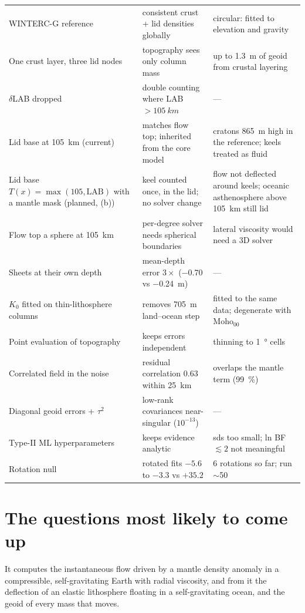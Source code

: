 \begin{center}
\begin{longtable}{p{}p{}p{}}
WINTERC-G reference & consistent crust + lid densities globally & circular: fitted to elevation and gravity\\
One crust layer, three lid nodes & topography sees only column mass & up to \qty{1.3}{m} of geoid from crustal layering\\
$\delta$LAB dropped & double counting where LAB $>\qty{105}{km}$ & ---\\
Lid base at \qty{105}{km} (current) & matches flow top; inherited from the core model & cratons \qty{+865}{m} high in the reference; keels treated as fluid\\
Lid base $T(x)=\max(105, \mathrm{LAB})$ with a mantle mask (planned, (b)) & keel counted once, in the lid; no solver change & flow not deflected around keels; oceanic asthenosphere above \qty{105}{km} still lid\\
Flow top a sphere at \qty{105}{km} & per-degree solver needs spherical boundaries & lateral viscosity would need a 3D solver\\
Sheets at their own depth & mean-depth error $3\times$ (\qty{-0.70}{} vs \qty{-0.24}{m}) & ---\\
$K_0$ fitted on thin-lithosphere columns & removes \qty{705}{m} land--ocean step & fitted to the same data; degenerate with Moho$_{00}$\\
Point evaluation of topography & keeps errors independent & thinning to \qty{1}{\degree} cells\\
Correlated field in the noise & residual correlation 0.63 within \qty{25}{km} & overlaps the mantle term (\qty{99}{\percent})\\
Diagonal geoid errors + $\tau^2$ & low-rank covariances near-singular ($10^{-13}$) & ---\\
Type-II ML hyperparameters & keeps evidence analytic & sds too small; ln BF $\lesssim2$ not meaningful\\
Rotation null & rotated fits $-5.6$ to $-3.3$ vs $+35.2$ & 6 rotations so far; run $\sim$50\\
\bottomrule
\end{longtable}
\end{center}

\section{The questions most likely to come up}

\A It computes the instantaneous flow driven by a mantle density anomaly in a compressible, self-gravitating Earth with radial viscosity, and from it the deflection of an elastic lithosphere floating in a self-gravitating ocean, and the geoid of every mass that moves.

